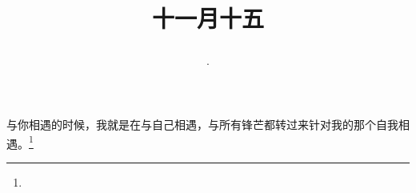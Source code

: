 \title{\date[d=15,m=12,y=2024][year:cn-y,年,month:cn,day:cn,日,·,weekday]·十一月十五 }
与你相遇的时候，我就是在与自己相遇，与所有锋芒都转过来针对我的那个自我相遇。\footnote{ }

